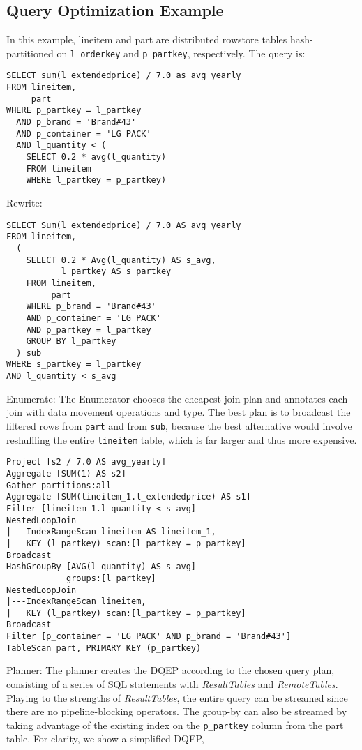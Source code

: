 \documentclass[11pt]{article}
\begin{document}
\subsection{Query Optimization Example}
\label{sec:org831a691}
In this example, lineitem and part are distributed rowstore tables hash-partitioned on \texttt{l\_orderkey} and
\texttt{p\_partkey}, respectively. The query is:
\begin{verbatim}
SELECT sum(l_extendedprice) / 7.0 as avg_yearly
FROM lineitem,
     part
WHERE p_partkey = l_partkey
  AND p_brand = 'Brand#43'
  AND p_container = 'LG PACK'
  AND l_quantity < (
    SELECT 0.2 * avg(l_quantity)
    FROM lineitem
    WHERE l_partkey = p_partkey)
\end{verbatim}

Rewrite:

\begin{verbatim}
SELECT Sum(l_extendedprice) / 7.0 AS avg_yearly
FROM lineitem,
  (
    SELECT 0.2 * Avg(l_quantity) AS s_avg,
           l_partkey AS s_partkey
    FROM lineitem,
         part
    WHERE p_brand = 'Brand#43'
    AND p_container = 'LG PACK'
    AND p_partkey = l_partkey
    GROUP BY l_partkey
  ) sub
WHERE s_partkey = l_partkey
AND l_quantity < s_avg
\end{verbatim}

Enumerate: The Enumerator chooses the cheapest join plan and annotates each join with data movement
operations and type. The best plan is to broadcast the filtered rows from \texttt{part} and from \texttt{sub}, because
the best alternative would involve reshuffling the entire \texttt{lineitem} table, which is far larger and thus more expensive.
\begin{verbatim}
Project [s2 / 7.0 AS avg_yearly]
Aggregate [SUM(1) AS s2]
Gather partitions:all
Aggregate [SUM(lineitem_1.l_extendedprice) AS s1]
Filter [lineitem_1.l_quantity < s_avg]
NestedLoopJoin
|---IndexRangeScan lineitem AS lineitem_1,
|   KEY (l_partkey) scan:[l_partkey = p_partkey]
Broadcast
HashGroupBy [AVG(l_quantity) AS s_avg]
            groups:[l_partkey]
NestedLoopJoin
|---IndexRangeScan lineitem,
|   KEY (l_partkey) scan:[l_partkey = p_partkey]
Broadcast
Filter [p_container = 'LG PACK' AND p_brand = 'Brand#43']
TableScan part, PRIMARY KEY (p_partkey)
\end{verbatim}

Planner: The planner creates the DQEP according to the chosen query plan, consisting of a series of
SQL statements with \emph{ResultTables} and \emph{RemoteTables}. Playing to the strengths of \emph{ResultTables}, the
entire query can be streamed since there are no pipeline-blocking operators. The group-by can also be
streamed by taking advantage of the existing index on the \texttt{p\_partkey} column from the part table. For
clarity, we show a simplified DQEP,
\end{document}
